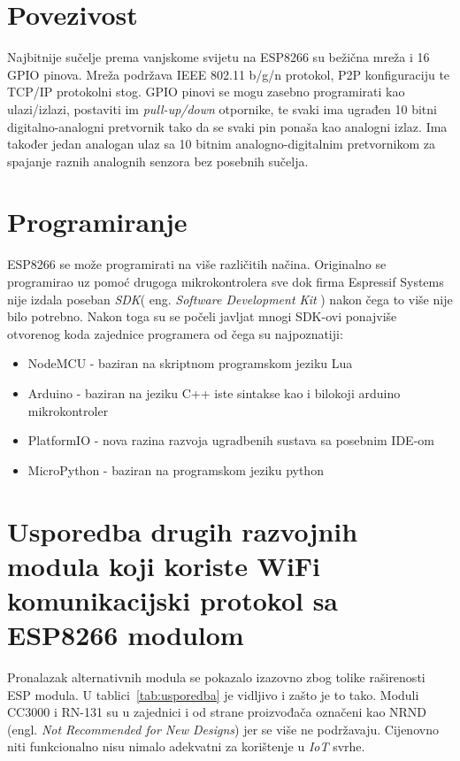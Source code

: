 \documentclass[times, utf8, zavrsni]{fer}
\begin{document}
\section{Povezivost}
Najbitnije sučelje prema vanjskome svijetu na ESP8266 su bežična mreža i 16 GPIO pinova.
Mreža podržava IEEE 802.11 b/g/n protokol, P2P konfiguraciju te TCP/IP protokolni stog.
GPIO pinovi se mogu zasebno programirati kao ulazi/izlazi, postaviti im \textit{pull-up/down} otpornike, te svaki ima ugrađen 10 bitni digitalno-analogni pretvornik tako da se svaki pin ponaša kao analogni izlaz.
Ima također jedan analogan ulaz sa 10 bitnim analogno-digitalnim pretvornikom za spajanje raznih analognih senzora bez posebnih sučelja.

\section{Programiranje} 
ESP8266 se može programirati na više različitih načina.
Originalno se programirao uz pomoć drugoga mikrokontrolera sve dok firma Espressif Systems nije izdala poseban \textit{SDK}(  eng. \textit{Software Development Kit} ) nakon čega to više nije bilo potrebno.
Nakon toga su se počeli javljat mnogi SDK-ovi ponajviše otvorenog koda zajednice programera od čega su najpoznatiji:
    \begin{itemize}
        \item NodeMCU - baziran na skriptnom programskom jeziku Lua
        \item Arduino - baziran na jeziku C++ iste sintakse kao i bilokoji arduino mikrokontroler
        \item PlatformIO - nova razina razvoja ugradbenih sustava sa posebnim IDE-om
        \item MicroPython - baziran na programskom jeziku python
    \end{itemize}

\section{Usporedba drugih razvojnih modula koji koriste WiFi komunikacijski protokol sa ESP8266 modulom}
Pronalazak alternativnih modula se pokazalo izazovno zbog tolike raširenosti ESP modula.
U tablici~\ref{tab:usporedba} je vidljivo i zašto je to tako.
Moduli CC3000 i RN-131 su u zajednici i od strane proizvođača označeni kao NRND (engl. \textit{Not Recommended for New Designs}) jer se više ne podržavaju.
Cijenovno niti funkcionalno nisu nimalo adekvatni za korištenje u \textit{IoT} svrhe.
\end{document}
